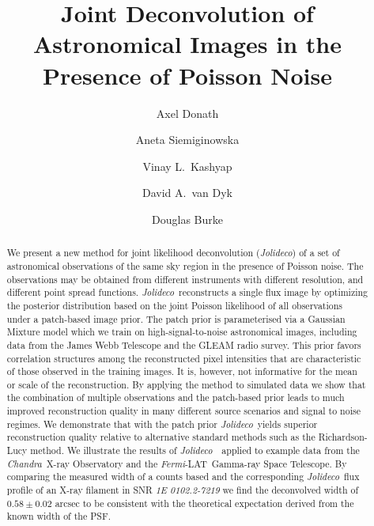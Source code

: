 \documentclass[twocolumn, linenumbers]{aastex631}
\newcommand{\chandra}{\textit{Chandra}~}
\newcommand{\ferminospace}{\textit{Fermi}-LAT}
\newcommand{\jolideco}{\textit{Jolideco}~}
\newcommand{\jolideconospace}{\textit{Jolideco}}
\begin{document}
    \title{Joint Deconvolution of Astronomical Images in the Presence of Poisson Noise}


    \author[0000-0003-4568-7005]{Axel Donath}
    \author[0000-0002-0905-7375]{Aneta Siemiginowska}
    \author[0000-0002-3869-7996]{Vinay L.\ Kashyap} 
    \author[0000-0002-0816-331X]{David A.\ van Dyk}
    \author[0000-0003-4428-7835]{Douglas Burke}


    \begin{abstract}
    
        We present a new method for joint likelihood deconvolution (\jolideconospace) of a set of astronomical observations of the same sky region in the presence of Poisson noise. 
        The observations may be obtained from different instruments with  different resolution, and different point spread functions. \jolideco reconstructs a single flux image by optimizing the posterior distribution based on the joint Poisson likelihood of all observations under a patch-based image prior. The patch prior is parameterised via a Gaussian Mixture model which we train on high-signal-to-noise astronomical images, including data from the  James Webb Telescope and the GLEAM radio survey. This prior favors correlation structures among the reconstructed pixel intensities that are characteristic of those observed in the training images. It is, however, not informative for the mean or scale of the reconstruction. By applying the method to simulated data we show that the combination of multiple observations and the patch-based prior leads to much improved reconstruction quality in many different source scenarios and signal to noise regimes. We demonstrate that with the patch prior \jolideco yields superior reconstruction quality relative to alternative standard methods such as the Richardson-Lucy method. We illustrate the results of \jolideco\ applied to example data from the \chandra X-ray Observatory and the \ferminospace\ Gamma-ray Space Telescope. By comparing the measured width of a counts based and the corresponding \jolideco flux profile of an X-ray filament in SNR {\it 1E 0102.2-7219} we find the deconvolved width of $0.58\pm 0.02$ arcsec to be consistent with the theoretical expectation derived from the known width of the PSF.
    \end{abstract}
\end{document}
